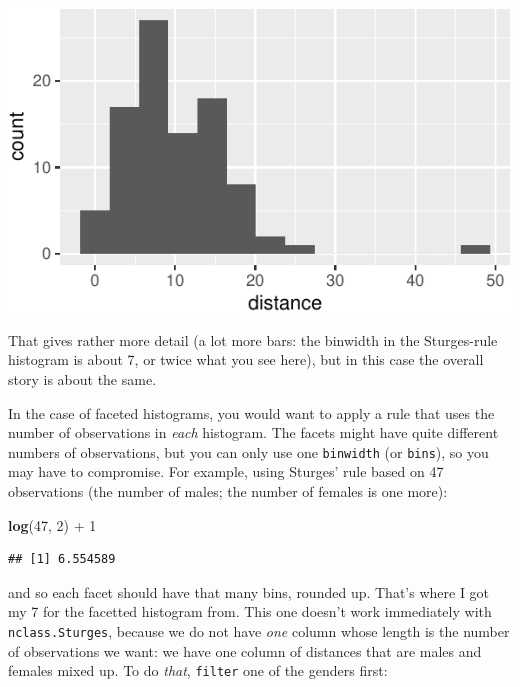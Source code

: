 \documentclass[]{tufte-book}
\newenvironment{Shaded}{}{}
\newcommand{\DecValTok}[1]{\textcolor[rgb]{0.25,0.63,0.44}{#1}}
\newcommand{\KeywordTok}[1]{\textcolor[rgb]{0.00,0.44,0.13}{\textbf{#1}}}
\newcommand{\NormalTok}[1]{#1}
\newcommand{\OperatorTok}[1]{\textcolor[rgb]{0.40,0.40,0.40}{#1}}
\newcommand{\StringTok}[1]{\textcolor[rgb]{0.25,0.44,0.63}{#1}}
\theoremstyle{definition}
\theoremstyle{definition}
\theoremstyle{definition}
\theoremstyle{remark}
\begin{document}
\includegraphics{05-two-sample-inference_files/figure-latex/unnamed-chunk-27-1}

That gives rather more detail (a lot more bars: the binwidth in the
Sturges-rule histogram is about 7, or twice what you see here), but in
this case the overall story is about the same.

In the case of faceted histograms, you would want to apply a rule that
uses the number of observations in \emph{each} histogram. The facets
might have quite different numbers of observations, but you can only use
one \texttt{binwidth} (or \texttt{bins}), so you may have to compromise.
For example, using Sturges' rule based on 47 observations (the number of
males; the number of females is one more):

\begin{Shaded}
\begin{Highlighting}[]
\KeywordTok{log}\NormalTok{(}\DecValTok{47}\NormalTok{, }\DecValTok{2}\NormalTok{) }\OperatorTok{+}\StringTok{ }\DecValTok{1}
\end{Highlighting}
\end{Shaded}

\begin{verbatim}
## [1] 6.554589
\end{verbatim}

and so each facet should have that many bins, rounded up. That's where I
got my 7 for the facetted histogram from. This one doesn't work
immediately with \texttt{nclass.Sturges}, because we do not have
\emph{one} column whose length is the number of observations we want: we
have one column of distances that are males and females mixed up. To do
\emph{that}, \texttt{filter} one of the genders first:

\begin{Shaded}
\end{Shaded}
\end{document}

